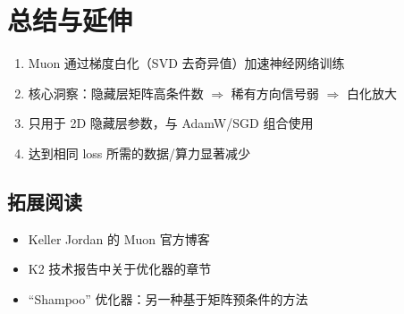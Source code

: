 \section{总结与延伸}

\begin{enumerate}
  \item Muon 通过梯度白化（SVD 去奇异值）加速神经网络训练
  \item 核心洞察：隐藏层矩阵高条件数 $\Rightarrow$ 稀有方向信号弱 $\Rightarrow$ 白化放大
  \item 只用于 2D 隐藏层参数，与 AdamW/SGD 组合使用
  \item 达到相同 loss 所需的数据/算力显著减少
\end{enumerate}

\subsection{拓展阅读}
\begin{itemize}
  \item Keller Jordan 的 Muon 官方博客
  \item K2 技术报告中关于优化器的章节
  \item ``Shampoo'' 优化器：另一种基于矩阵预条件的方法
\end{itemize}


